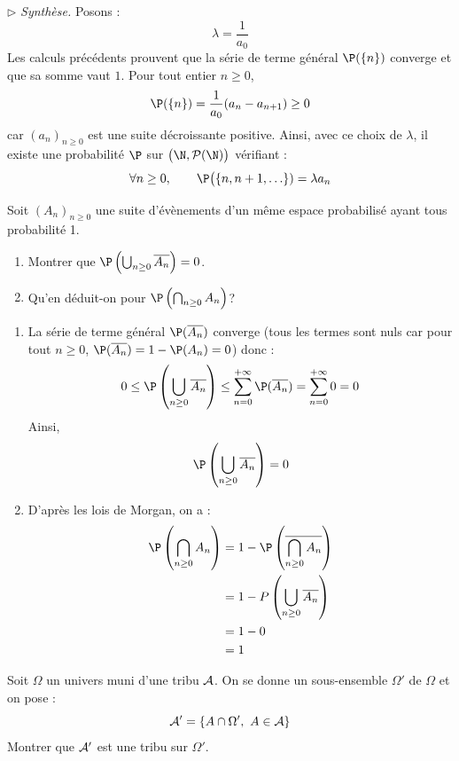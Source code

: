 \documentclass[a4paper,10pt]{report}
\begin{document}
\medskip

\noindent $\rhd$ \textit{Synthèse.} Posons :
$$ \lambda = \dfrac{1}{a_0}$$
Les calculs précédents prouvent que la série de terme général $\P( \lbrace n \rbrace)$ converge et que sa somme vaut $1$. Pour tout entier $n \geq 0$,
$$ \P( \lbrace n \rbrace) = \dfrac{1}{a_0} (a_n - a_{n+1}) \geq 0$$
car $(a_n)_{n \geq 0}$ est une suite décroissante positive. Ainsi, avec ce choix de $\lambda$, il existe une probabilité $\P$ sur $\bigl(\N,\mathcal{P}(\N)\bigr)$ vérifiant :
    \[
    \forall n \geq 0, \qquad \P\bigl( \lbrace n, n+1, \ldots \rbrace) = \lambda a_n
    \]
    
\begin{Exercice}{} Soit $(A_n)_{n \geq 0}$ une suite d'évènements d'un même espace probabilisé ayant tous probabilité 1. 
 
 \begin{enumerate}
 \item Montrer que $\P \left( \bigcup_{n \geq 0} \overline{A_n} \right) = 0$.
 \item Qu'en déduit-on pour $\P \left( \bigcap_{n \geq 0} A_n \right)$?
 \end{enumerate}
 \end{Exercice}
 
 \corr 
 
 \begin{enumerate}
 \item La série de terme général $\P( \overline{A_n})$ converge (tous les termes sont nuls car pour tout $n \geq 0$, $\P( \overline{A_n})= 1- \P(A_n)=0$) donc :
 $$ 0 \leq \P \left( \bigcup_{n \geq 0} \overline{A_n} \right) \leq \sum_{n=0}^{+ \infty} \P( \overline{A_n})  = \sum_{n=0}^{+ \infty} 0 = 0$$
 Ainsi,
 $$ \P \left( \bigcup_{n \geq 0} \overline{A_n} \right)=0$$
 \item D'après les lois de Morgan, on a :
 \begin{align*}
 \P \left( \bigcap_{n \geq 0} A_n \right) & = 1 - \P \left( \overline{\bigcap_{n \geq 0} A_n} \right) \\
 &= 1 - P \left( \bigcup_{n \geq 0} \overline{A_n} \right) \\
 & =1-0 \\
 & = 1
 \end{align*}
 \end{enumerate}
 
 
\begin{Exercice}{} Soit $\Omega$ un univers muni d'une tribu ${\cal A}$. On se donne un sous-ensemble $\Omega'$ de $\Omega$ et on pose :
 $${\cal A}'=\{A\cap \Omega',\ A\in{\cal A}\}$$
Montrer que ${\cal A}'$ est une tribu sur $\Omega'.$
\end{Exercice}
\end{document}
